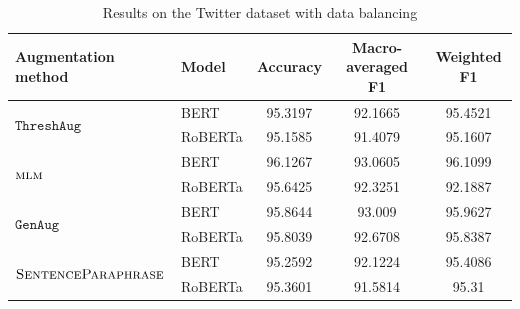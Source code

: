 \documentclass[11pt,a4paper]{article}
\newcommand{\senttfpara}{$\textsc{SentenceParaphrase}$}
\newcommand{\mlm}{$\textsc{mlm}$}
\newcommand{\genaug}{$\texttt{GenAug}$}
\newcommand{\threshaug}{$\texttt{ThreshAug}$}
\begin{document}
\begin{table}[]
    \small
    \centering
    \begin{tabular}{llccc}
        \toprule
        \textbf{Augmentation method} & \textbf{Model} & \textbf{Accuracy} & \textbf{Macro-averaged F1} & \textbf{Weighted F1} \\
        \midrule
        \multirow{2}{*}{\threshaug} & BERT & 95.3197 & 92.1665 & 95.4521 \\
         & RoBERTa & 95.1585 & 91.4079 & 95.1607 \\\midrule
        
        \multirow{2}{*}{\mlm} & BERT & 96.1267 & 93.0605 & 96.1099 \\
         & RoBERTa & 95.6425 & 92.3251 & 92.1887 \\\midrule
        
        \multirow{2}{*}{\genaug} & BERT & 95.8644 & 93.009 & 95.9627 \\
         & RoBERTa & 95.8039 & 92.6708 & 95.8387 \\\midrule
        
        \multirow{2}{*}{\senttfpara} & BERT & 95.2592 & 92.1224 & 95.4086 \\
         & RoBERTa & 95.3601 & 91.5814 & 95.31 \\
        \bottomrule
    \end{tabular}
    \caption{Results on the Twitter dataset with data balancing}
    \label{tab:twitter15k}
\end{table}
\end{document}
